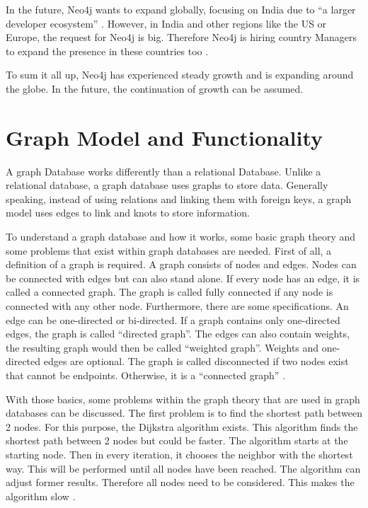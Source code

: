 In the future, Neo4j wants to expand globally, focusing on India due to \enquote{a larger developer ecosystem} \parencite{historyneo4j}. However, in India and other regions like the US or Europe, the request 
for Neo4j is big. Therefore Neo4j is hiring country Managers to expand the presence in these countries too \parencite{historyneo4j}.

To sum it all up, Neo4j has experienced steady growth and is expanding around the globe. In the future, the continuation of growth can be assumed.

\section{Graph Model and Functionality} \label{sec:graphModelFunctionalityNeo4j}

A graph Database works differently than a relational Database. Unlike a relational database, a graph database uses graphs to store data. Generally speaking, instead of using relations and linking them with foreign keys, a graph model uses edges to link and knots to store information.

To understand a graph database and how it works, some basic graph theory and some problems that exist within graph databases are needed. First of all, a definition of a graph is required. A graph consists of nodes and edges. Nodes can be connected with edges but can also stand alone. If every node has an edge, it is called a connected graph. The graph is called fully connected if any node is connected with any other node.
Furthermore, there are some specifications. An edge can be one-directed or bi-directed. If a graph contains only one-directed edges, the graph is called \enquote{directed graph}. The edges can also contain weights, the resulting graph would then be called \enquote{weighted graph}. Weights and one-directed edges are optional. The graph is called disconnected if two nodes exist that cannot be endpoints. Otherwise, it is a \enquote{connected graph} \parencite{graphBasics}.

With those basics, some problems within the graph theory that are used in graph databases can be discussed. The first problem is to find the shortest path between 2 nodes. For this purpose, the Dijkstra algorithm exists. This algorithm finds the shortest path between 2 nodes but could be faster. The algorithm starts at the starting node. Then in every iteration, it chooses the neighbor with the shortest way. This will be performed until all nodes have been reached.
The algorithm can adjust former results. Therefore all nodes need to be considered. This makes the algorithm slow \parencite{dijkstra}.

